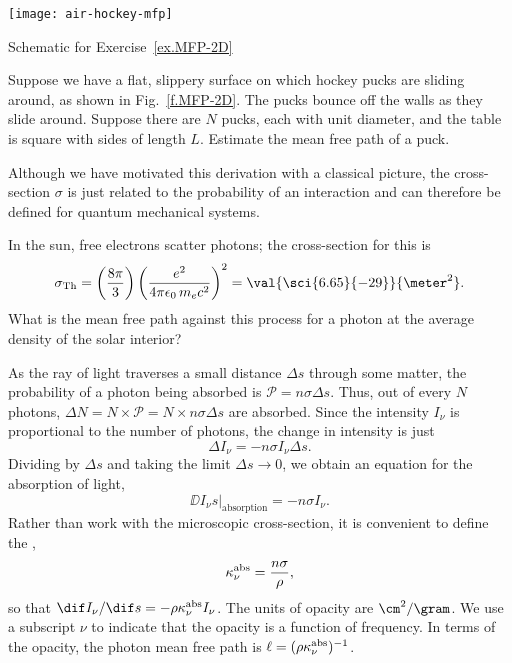 \begin{marginfigure}[3\baselineskip]
    \texttt{[image: air-hockey-mfp]}
    \caption[Mean free path of a hockey puck]{\label{f.MFP-2D}Schematic for Exercise~\ref{ex.MFP-2D}}
\end{marginfigure}
\begin{exercisebox}\label{ex.MFP-2D}
    Suppose we have a flat, slippery surface on which hockey pucks are sliding around, as shown in Fig.~\ref{f.MFP-2D}. The pucks bounce off the walls as they slide around.  Suppose there are $N$ pucks, each with unit diameter, and the table is square with sides of length $L$.  Estimate the mean free path of a puck.
\end{exercisebox}

Although we have motivated this derivation with a classical picture, the cross-section $\sigma$ is just related to the probability of an interaction and can therefore be defined for quantum mechanical systems.

\begin{exercisebox}\label{ex.MFP}
    In the sun, free electrons scatter photons; the cross-section for this is
    \[
    \sigma_{\mathrm{Th}} = \left(\frac{8\pi}{3}\right)\left(\frac{e^2}{4\pi\epsilon_{0}\,m_e c^2}\right)^2 = \val{\sci{6.65}{-29}}{\meter^2}.
    \]
    What is the mean free path against this process for a photon at the average density of the solar interior?
\end{exercisebox}

As the ray of light traverses a small distance $\Delta s$ through some matter, the probability of a photon being absorbed is $\mathcal{P} = n\sigma\Delta s$. Thus, out of every $N$ photons, $\Delta N = N \times\mathcal{P} = N\times n\sigma\Delta s$ are absorbed. Since the intensity $I_{\nu}$ is proportional to the number of photons, the change in intensity is just
\[ \Delta I_{\nu} = -n\sigma I_{\nu}\Delta s. \]
Dividing by $\Delta s$ and taking the limit $\Delta s\to0$, we obtain an equation for the absorption of light,
\begin{equation}\label{e.absorption-microscopic}
\left.\DD{I_{\nu}}{s}\right|_{\mathrm{absorption}} = -n\sigma I_{\nu}.
\end{equation}
Rather than work with the microscopic cross-section, it is convenient to define the ,
\[
	\kappa_\nu^{\mathrm{abs}} = \frac{n\sigma}{\rho},
\]
so that $\dif I_{\nu}/\dif s = -\rho\kapabs I_{\nu}$. The units of opacity are $\cm^{2}/\gram$. We use a subscript $\nu$ to indicate that the opacity is a function of frequency. In terms of the opacity, the photon mean free path is $\ell = (\rho\kappa_\nu^{\mathrm{abs}})^{-1}$.

